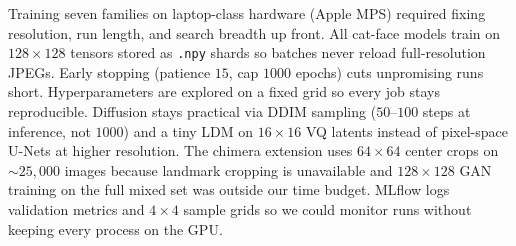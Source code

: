 \documentclass[cameraready]{Interspeech}
\begin{document}
Training seven families on laptop-class hardware (Apple MPS) required fixing resolution, run length, and search breadth up front. All cat-face models train on $128 \times 128$ tensors stored as \texttt{.npy} shards so batches never reload full-resolution JPEGs. Early stopping (patience $15$, cap $1000$ epochs) cuts unpromising runs short. Hyperparameters are explored on a fixed grid so every job stays reproducible. Diffusion stays practical via DDIM sampling ($50$--$100$ steps at inference, not $1000$) and a tiny LDM on $16 \times 16$ VQ latents instead of pixel-space U-Nets at higher resolution. The chimera extension uses $64 \times 64$ center crops on $\sim 25{,}000$ images because landmark cropping is unavailable and $128 \times 128$ GAN training on the full mixed set was outside our time budget. MLflow logs validation metrics and $4 \times 4$ sample grids so we could monitor runs without keeping every process on the GPU.

\begin{table}[!htbp]
    \centering
    \caption{Hyperparameter grid summary across generative model families. Cat-face total ($138$) is $132$ grid cells $\times$ three seeds, plus three PixelCNN prior runs and three fixed Tiny LDM runs for the prior-comparison experiment.}
    \label{tab:hyperparam_grid}
    \renewcommand{\arraystretch}{1.4}
\end{table}
\end{document}
